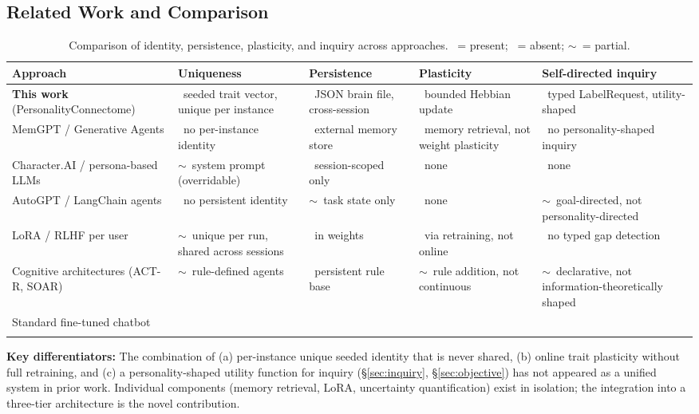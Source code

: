 \documentclass[11pt,a4paper]{article}
\newcommand{\cmark}{\ding{51}}
\newcommand{\xmark}{\ding{55}}
\newcommand{\warn}{$\sim$}
\begin{document}
\subsection{Related Work and Comparison}
\label{sec:related}

\begin{longtable}{p{3.2cm}p{2.8cm}p{2.8cm}p{2.8cm}p{3cm}}
\toprule
\textbf{Approach} & \textbf{Uniqueness} & \textbf{Persistence} &
\textbf{Plasticity} & \textbf{Self-directed inquiry}\\
\midrule
\endhead
\textbf{This work} (PersonalityConnectome)
  & \cmark\ seeded trait vector, unique per instance
  & \cmark\ JSON brain file, cross-session
  & \cmark\ bounded Hebbian update
  & \cmark\ typed LabelRequest, utility-shaped \\[4pt]
MemGPT / Generative Agents \cite{park2023,packer2023}
  & \xmark\ no per-instance identity
  & \cmark\ external memory store
  & \xmark\ memory retrieval, not weight plasticity
  & \xmark\ no personality-shaped inquiry \\[4pt]
Character.AI / persona-based LLMs
  & \warn\ system prompt (overridable)
  & \xmark\ session-scoped only
  & \xmark\ none
  & \xmark\ none \\[4pt]
AutoGPT / LangChain agents \cite{gravitas2023}
  & \xmark\ no persistent identity
  & \warn\ task state only
  & \xmark\ none
  & \warn\ goal-directed, not personality-directed \\[4pt]
LoRA / RLHF per user
  & \warn\ unique per run, shared across sessions
  & \cmark\ in weights
  & \cmark\ via retraining, not online
  & \xmark\ no typed gap detection \\[4pt]
Cognitive architectures (ACT-R, SOAR)
  & \warn\ rule-defined agents
  & \cmark\ persistent rule base
  & \warn\ rule addition, not continuous
  & \warn\ declarative, not information-theoretically shaped \\[4pt]
Standard fine-tuned chatbot
  & \xmark & \xmark & \xmark & \xmark \\
\bottomrule
\caption{Comparison of identity, persistence, plasticity, and inquiry across approaches.
\cmark~= present; \xmark~= absent; \warn~= partial.}
\end{longtable}

\textbf{Key differentiators:} The combination of (a) per-instance unique seeded identity
that is never shared, (b) online trait plasticity without full retraining, and (c) a
personality-shaped utility function for inquiry (\S\ref{sec:inquiry}, \S\ref{sec:objective})
has not appeared as a unified system in prior work. Individual components (memory
retrieval, LoRA, uncertainty quantification) exist in isolation; the integration into a
three-tier architecture is the novel contribution.
\end{document}
